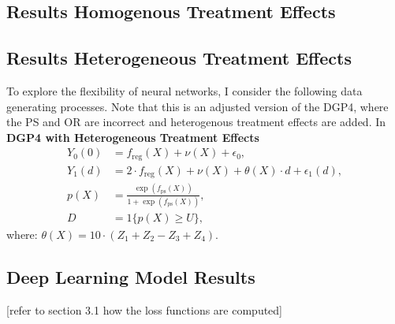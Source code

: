 \subsection{Results Homogenous Treatment Effects}



\subsection{Results Heterogeneous Treatment Effects}
To explore the flexibility of neural networks, I consider the following data generating processes. Note that this is an adjusted version of the DGP4, where the PS and OR are incorrect and heterogenous treatment effects are added. In \\
\textbf{DGP4 with Heterogeneous Treatment Effects}
\begin{align*}
    Y_0(0) &= f_{\text{reg}}(X) + \nu(X) + \epsilon_0, \\
    Y_1(d) &= 2 \cdot f_{\text{reg}}(X) + \nu(X) + \theta(X) \cdot d + \epsilon_1(d), \\
    p(X) &= \frac{\exp \left( f_{\text{ps}}(X) \right)}{1 + \exp \left( f_{\text{ps}}(X) \right)}, \\
    D &= 1\{ p(X) \geq U \},
\end{align*}
where: $\theta(X) = 10 \cdot (Z_1 + Z_2 - Z_3 + Z_4)$.



\subsection{Deep Learning Model Results}
[refer to section 3.1 how the loss functions are computed]


